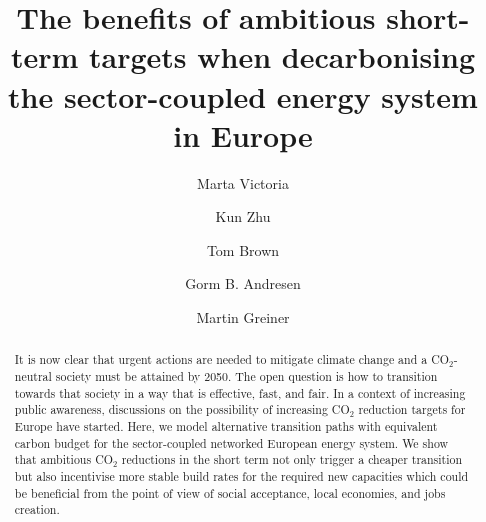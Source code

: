 \documentclass[5p]{elsarticle} %
\begin{document}
\begin{frontmatter}

\title{The benefits of ambitious short-term targets when decarbonising the sector-coupled energy system in Europe}

\author[mymainaddress,iClimate]{Marta Victoria}
\author[mymainaddress]{Kun Zhu}
\author[kitaddress]{Tom Brown}
\author[mymainaddress,iClimate]{Gorm B. Andresen}
\author[mymainaddress,iClimate]{Martin Greiner}
\address[mymainaddress]{Department of Engineering, Aarhus University, Inge Lehmanns Gade 10, 8000 Aarhus, Denmark}
\address[iClimate]{iCLIMATE Interdisciplinary Centre for Climate Change, Aarhus University}
\address[kitaddress]{Institute for Automation and Applied Informatics (IAI), Karlsruhe Institute of Technology (KIT), Forschungszentrum 449, 76344, Eggenstein-Leopoldshafen, Germany}



\begin{abstract}

It is now clear that urgent actions are needed to mitigate climate change and a CO$_2$-neutral society must be attained by 2050. The open question is how to transition towards that society in a way that is effective, fast, and fair. In a context of increasing public awareness, discussions on the possibility of increasing CO$_2$ reduction targets for Europe have started. Here, we model alternative transition paths with equivalent carbon budget for the sector-coupled networked European energy system. We show that ambitious CO$_2$ reductions in the short term not only trigger a cheaper transition but also incentivise more stable build rates for the required new capacities which could be beneficial from the point of view of social acceptance, local economies, and jobs creation.

\end{abstract}

\begin{keyword}


\end{keyword}

\end{frontmatter}
\end{document}
